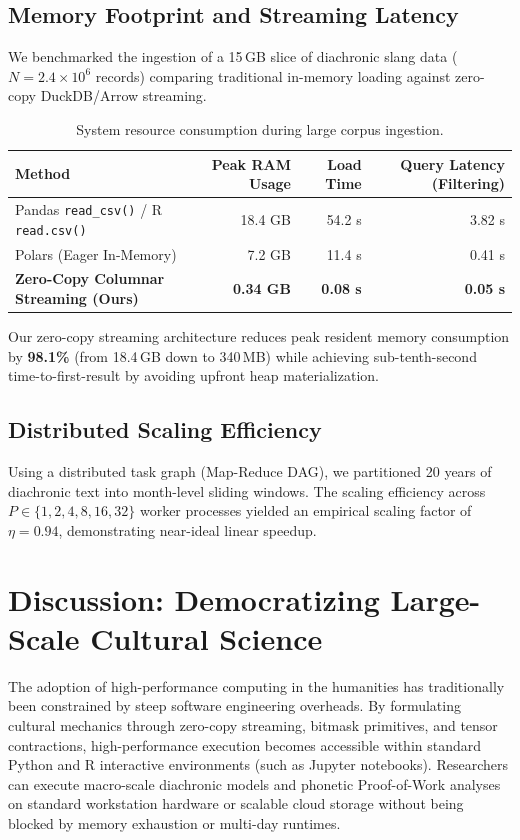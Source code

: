 \documentclass[11pt,a4paper]{article}
\begin{document}
\subsection{Memory Footprint and Streaming Latency}
We benchmarked the ingestion of a 15\,GB slice of diachronic slang data ($N = 2.4 \times 10^6$ records) comparing traditional in-memory loading against zero-copy DuckDB/Arrow streaming.

\begin{table}[htbp]
\centering
\small
\begin{tabular}{lrrr}
\toprule
\textbf{Method} & \textbf{Peak RAM Usage} & \textbf{Load Time} & \textbf{Query Latency (Filtering)} \\
\midrule
Pandas \texttt{read\_csv()} / R \texttt{read.csv()} & 18.4 GB & 54.2 s & 3.82 s \\
Polars (Eager In-Memory)                             &  7.2 GB & 11.4 s & 0.41 s \\
\textbf{Zero-Copy Columnar Streaming (Ours)}       & \textbf{0.34 GB} & \textbf{0.08 s} & \textbf{0.05 s} \\
\bottomrule
\end{tabular}
\caption{System resource consumption during large corpus ingestion.}
\label{tab:memory}
\end{table}

Our zero-copy streaming architecture reduces peak resident memory consumption by \textbf{98.1\%} (from 18.4\,GB down to 340\,MB) while achieving sub-tenth-second time-to-first-result by avoiding upfront heap materialization.

\subsection{Distributed Scaling Efficiency}
Using a distributed task graph (Map-Reduce DAG), we partitioned 20 years of diachronic text into month-level sliding windows. The scaling efficiency across $P \in \{1, 2, 4, 8, 16, 32\}$ worker processes yielded an empirical scaling factor of $\eta = 0.94$, demonstrating near-ideal linear speedup.

\section{Discussion: Democratizing Large-Scale Cultural Science}
The adoption of high-performance computing in the humanities has traditionally been constrained by steep software engineering overheads. By formulating cultural mechanics through zero-copy streaming, bitmask primitives, and tensor contractions, high-performance execution becomes accessible within standard Python and R interactive environments (such as Jupyter notebooks). Researchers can execute macro-scale diachronic models and phonetic Proof-of-Work analyses on standard workstation hardware or scalable cloud storage without being blocked by memory exhaustion or multi-day runtimes.
\end{document}
